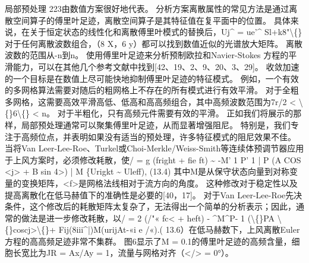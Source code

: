 \documentclass[UTF8,11pt,a4paper,openany,fontset=fandol]{ctexbook}
\begin{document}
局部预处理 223由数值方案很好地代表。 分析方案离散属性的常见方法是通过离散空间算子的傅里叶足迹，离散空间算子是其特征值在复平面中的位置。 具体来说，在关于恒定状态的线性化和离散傅里叶模式的替换后，Uj\textasciicircum{} = ue'\textasciicircum{} Sl+k8"\textbackslash\{\}对于任何离散波数组合，（8 X，6 y）都可以找到数值近似的光谱放大矩阵。 离散波数的范围从-n到n。 使用傅里叶足迹来分析预制欧拉和Navier-Stokes 方程的平滑能力，可以在其他几个参考文献中找到[42、19、2、9、20、3、29]。 收敛加速的一个目标是在数值上尽可能快地抑制傅里叶足迹的特征模式。 例如，一个有效的多网格算法需要对随后的粗网格上不存在的所有模式进行有效平滑。 对于全粗多网格，这需要高效平滑高低、低高和高高频组合，其中高频波数范围为7r/2 < \textbackslash\{\}6\textbackslash\{\} < n。 对于半粗化，只有高频元件需要有效的平滑。 正如我们将展示的那样，局部预处理通常可以聚集傅里叶足迹，从而显著增强阻尼。 特别是，我们专注于高频位点，并表明如果没有适当的预处理，许多特征模式的阻尼效果不佳。 当将Van Leer-Lee-Roe、Turkel或Choi-Merkle/Weiss-Smith等连续体预调节器应用于上风方案时，必须修改耗散，使/ = g (fright + fie ft) \textasciitilde{} -M' 1 P' 1 | P (A COS <j> + B sin 4>) | M \{Urigkt \textasciitilde{} Uleff), (13.4) 其中M是从保守状态向量到对称变量的变换矩阵，<f>是网格法线相对于流方向的角度。 这种修改对于稳定性以及提高离散化在低马赫值下的准确性是必要的[40，17]。 对于Van Leer-Lee-Roe先决条件，这个修改后的耗散矩阵太复杂了，无法得出一个简单的分析表示；因此，通常的做法是进一步修改耗散，以/ = 2 (/"« fc< + heft) - \textasciicircum{}M\textasciicircum{}P- 1 (\textbackslash\{\}PA \textbackslash\{\}coscj>\textbackslash\{\}+ Fij(8iii\textasciicircum{}|)M(urijAt-«i e /«).( 13.6）在低马赫数下，上风离散Euler 方程的高高频足迹非常不集群。 图6显示了M = 0.1的傅里叶足迹的高频含量，细胞长宽比为JR = Ax/Ay = 1，流量与网格对齐（</> = 0°）。
\end{document}
